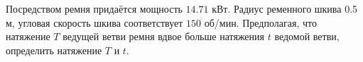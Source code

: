 Посредством ремня придаётся мощность $14.71$ кВт. Радиус ременного шкива
0.5 м, угловая скорость шкива соответствует $150$ об/мин. Предполагая,
что натяжение $T$ ведущей ветви ремня вдвое больше натяжения $t$ ведомой
ветви, определить натяжение $T$ и $t$.
